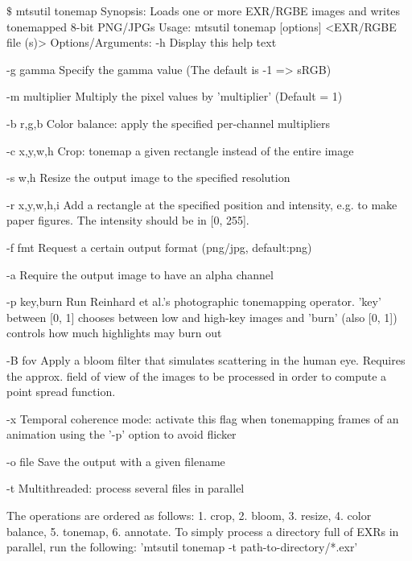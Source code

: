 \begin{console}[label=lst:tonemap-cli,caption=Command line options of the \texttt{mtsutil tonemap} utility]
$\texttt{\$}$ mtsutil tonemap
Synopsis: Loads one or more EXR/RGBE images and writes tonemapped 8-bit PNG/JPGs
Usage: mtsutil tonemap [options] <EXR/RGBE file (s)>
Options/Arguments:
   -h             Display this help text

   -g gamma       Specify the gamma value (The default is -1 => sRGB)

   -m multiplier  Multiply the pixel values by 'multiplier' (Default = 1)

   -b r,g,b       Color balance: apply the specified per-channel multipliers

   -c x,y,w,h     Crop: tonemap a given rectangle instead of the entire image

   -s w,h         Resize the output image to the specified resolution

   -r x,y,w,h,i   Add a rectangle at the specified position and intensity, e.g.
                  to make paper figures. The intensity should be in [0, 255].

   -f fmt         Request a certain output format (png/jpg, default:png)

   -a             Require the output image to have an alpha channel

   -p key,burn    Run Reinhard et al.'s photographic tonemapping operator. 'key'
                  between [0, 1] chooses between low and high-key images and
                  'burn' (also [0, 1]) controls how much highlights may burn out

   -B fov         Apply a bloom filter that simulates scattering in the human
                  eye. Requires the approx. field of view of the images to be
                  processed in order to compute a point spread function.

   -x             Temporal coherence mode: activate this flag when tonemapping
                  frames of an animation using the '-p' option to avoid flicker

   -o file        Save the output with a given filename

   -t             Multithreaded: process several files in parallel

 The operations are ordered as follows: 1. crop, 2. bloom, 3. resize, 4. color
 balance, 5. tonemap, 6. annotate. To simply process a directory full of EXRs
 in parallel, run the following: 'mtsutil tonemap -t path-to-directory/*.exr'
\end{console}
